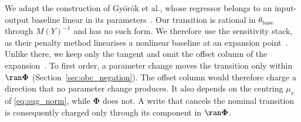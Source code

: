 We adapt the construction of Gy\"or\"ok et al., whose regressor belongs to an
input-output baseline linear in its parameters~\cite[Eq.~(2)]{gyorok2026obc}.
Our transition is rational in $\theta_{\mathrm{base}}$ through $M(Y)^{-1}$ and
has no such form.
We therefore use the sensitivity stack, as their penalty method linearises a
nonlinear baseline at an expansion point~\cite[Sec.~4]{gyorok2025l4dc}.
Unlike there, we keep only the tangent and omit the offset column of the
expansion~\cite[Eq.~(18)]{gyorok2025l4dc}.
To first order, a parameter change moves the transition only within
$\ran\boldsymbol\Phi$ (Section~\ref{sec:obc_negation}).
The offset column would therefore charge a direction that no parameter change
produces.
It also depends on the centring $\mu_x$ of \eqref{eq:aug_norm}, while
$\boldsymbol\Phi$ does not.
A write that cancels the nominal transition is consequently charged only
through its component in $\ran\boldsymbol\Phi$.

